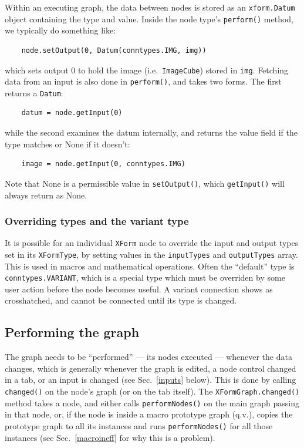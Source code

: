 Within an executing graph, the data between nodes is stored as an \texttt{xform.Datum}
object containing the type and value. Inside the node type's \texttt{perform()} method,
we typically do something like:
\begin{lstlisting}
    node.setOutput(0, Datum(conntypes.IMG, img))
\end{lstlisting}
which sets output 0 to hold the image (i.e.\ \texttt{ImageCube}) stored in \texttt{img}.
Fetching data from an input is also done in \texttt{perform()}, and takes two forms. The
first returns a \texttt{Datum}:
\begin{lstlisting}
    datum = node.getInput(0)
\end{lstlisting}
while the second examines the datum internally, and returns the value field if
the type matches or None if it doesn't:
\begin{lstlisting}
    image = node.getInput(0, conntypes.IMG)
\end{lstlisting}
Note that None is a permissible value in \texttt{setOutput()}, which \texttt{getInput()} will
always return as None.

\subsubsection{Overriding types and the variant type}
It is possible for an individual \texttt{XForm} node to override the input and output types
set in its \texttt{XFormType}, by setting values in the \texttt{inputTypes} and \texttt{outputTypes}
array. This is used in macros and mathematical operations. Often the ``default'' type is \texttt{conntypes.VARIANT},
which is a special type which must be overriden by some user action before the node becomes useful. A variant connection
shows as crosshatched, and cannot be connected until its type is changed.

\subsection{Performing the graph}
\label{graphperform}
The graph needs to be ``performed'' --- its nodes executed --- whenever
the data changes, which is generally whenever the graph is edited,
a node control changed in a tab, or an input is changed (see Sec.~\ref{inputs}
below).
This is done by calling \texttt{changed()} on the node's graph (or on the tab itself).
The \texttt{XFormGraph.changed()} method takes a node, and either calls
\texttt{performNodes()} on the main graph passing in that node, or, if the
node is inside a macro prototype graph (q.v.), copies the prototype graph to
all its instances and runs \texttt{performNodes()} for all those instances
(see Sec.~\ref{macroineff} for why this is a problem).

